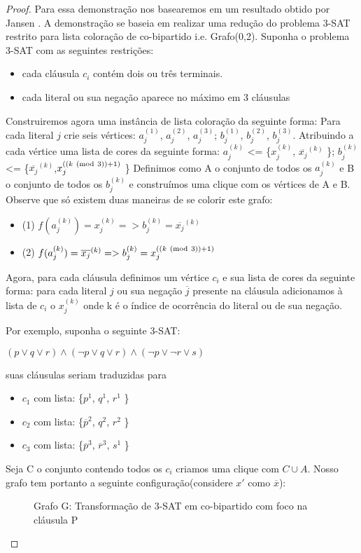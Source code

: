 \begin{proof}
		Para essa demonstração nos basearemos em um resultado obtido por Jansen \cite{jansen1999}. A demonstração se baseia em realizar uma redução do problema 3-SAT restrito para lista coloração de co-bipartido i.e. Grafo(0,2).
		Suponha o problema 3-SAT com as seguintes restrições:
		\begin{itemize}
			\item cada cláusula $c_i$ contém dois ou três terminais.
			\item cada literal ou sua negação aparece no máximo em 3 cláusulas
		\end{itemize}
		Construiremos agora uma instância de lista coloração da seguinte forma:\newline
		Para cada literal $j$ crie seis vértices:
		$a_j^{(1)}$, $a_j^{(2)}$, $a_j^{(3)}$;
		$b_j^{(1)}$, $b_j^{(2)}$, $b_j^{(3)}$. Atribuindo a cada vértice uma lista de cores da seguinte forma:\newline
		$a_j^{(k)}$ <= \{$x_j^{(k)}$, $\overline{x_j}^{(k)}$ \}; $b_j^{(k)}$ <= \{$\overline{x_j}^{(k)}$,$x_j^{((k \ (\mathrm{mod}\ 3)) + 1 )}$ \}\newline
		Definimos como A o conjunto de todos os $a_j^{(k)}$ e B o conjunto de todos os $b_j^{(k)}$ e construímos uma clique com os vértices de A e B. Observe que só existem duas maneiras de se colorir este grafo:
		\begin{itemize}
			\item (1)  $f(a_j^{(k)}) = x_j^{(k)} => b_j^{(k)} = \overline{x_j}^{(k)}$
			\item (2)  $f(a_j^{(k)}) = \overline{x_j}^{(k)} => b_j^{(k)} = x_j^{((k \ (\mathrm{mod}\ 3)) + 1 )}$
		\end{itemize}
		Agora, para cada cláusula definimos um vértice $c_i$ e sua lista de cores da seguinte forma: para cada literal $j$ ou sua negação $\overline{j}$ presente na cláusula adicionamos à lista de $c_i$ o $x_j^{(k)}$ onde k é o índice de ocorrência do literal ou de sua negação.

		Por exemplo, suponha o seguinte 3-SAT:

		$(p \lor q \lor r) \land (\neg{p} \lor q \lor r) \land (\neg{p} \lor \neg{r} \lor s)$

		suas cláusulas seriam traduzidas para
		\begin{itemize}
			\item $c_1$ com lista: \{$p^1$, $q^1$, $r^1$ \}
			\item $c_2$ com lista: \{$\overline{p}^2$, $q^2$, $r^2$ \}
			\item $c_3$ com lista: \{$\overline{p}^3$, $\overline{r}^3$, $s^1$ \}
		\end{itemize}
		Seja C o conjunto contendo todos os $c_i$ criamos uma clique com $C \cup A$.
		Nosso grafo tem portanto a seguinte configuração(considere $x'$ como $\overline{x}$):
		\begin{figure}[!ht]
			\centering
			
			\caption{Grafo G: Transformação de 3-SAT em co-bipartido com foco na cláusula P }
		\end{figure}


\end{proof}
